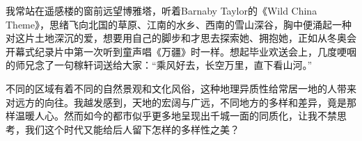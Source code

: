 \par 我常站在遥感楼的窗前远望博雅塔，听着Barnaby Taylor的《Wild China Theme》，思绪飞向北国的草原、江南的水乡、西南的雪山深谷，胸中便涌起一种对这片土地深沉的爱，想要用自己的脚步和才思去探索她、拥抱她，正如从冬奥会开幕式纪录片中第一次听到童声唱《万疆》时一样。想起毕业欢送会上，几度哽咽的师兄念了一句稼轩词送给大家：“乘风好去，长空万里，直下看山河。”
\par 不同的区域有着不同的自然景观和文化风俗，这种地理异质性给常居一地的人带来对远方的向往。我越发感到，天地的宏阔与广远，不同地方的多样和差异，竟是那样温暖人心。然而如今的都市似乎更多地呈现出千城一面的同质化，让我不禁思考，我们这个时代又能给后人留下怎样的多样性之美？
\par {}
\par {}




